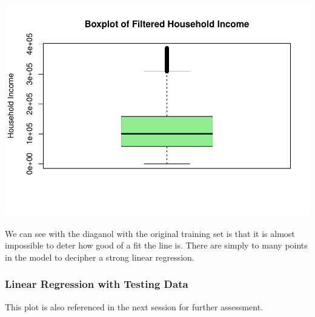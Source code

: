 \documentclass[
]{article}
\newenvironment{Shaded}{\begin{snugshade}}{\end{snugshade}}
\newcommand{\AttributeTok}[1]{\textcolor[rgb]{0.13,0.29,0.53}{#1}}
\newcommand{\CommentTok}[1]{\textcolor[rgb]{0.56,0.35,0.01}{\textit{#1}}}
\newcommand{\FunctionTok}[1]{\textcolor[rgb]{0.13,0.29,0.53}{\textbf{#1}}}
\newcommand{\NormalTok}[1]{#1}
\newcommand{\OtherTok}[1]{\textcolor[rgb]{0.56,0.35,0.01}{#1}}
\newcommand{\SpecialCharTok}[1]{\textcolor[rgb]{0.81,0.36,0.00}{\textbf{#1}}}
\newcommand{\StringTok}[1]{\textcolor[rgb]{0.31,0.60,0.02}{#1}}
\begin{document}
\begin{Shaded}
\end{Shaded}

\includegraphics{Project_1_456_files/figure-latex/unnamed-chunk-12-1.pdf}

We can see with the diaganol with the original training set is that it
is almost impossible to deter how good of a fit the line is. There are
simply to many points in the model to decipher a strong linear
regression.

\subsubsection{Linear Regression with Testing
Data}\label{linear-regression-with-testing-data}

This plot is also referenced in the next session for further assessment.
\end{document}
